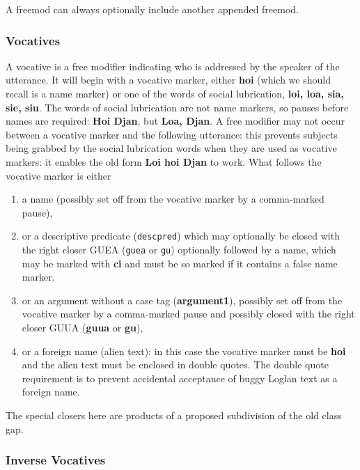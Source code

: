 \documentclass[12pt]{book}
\begin{document}
A freemod can always optionally include another appended freemod.

\subsubsection{Vocatives}

A vocative is a free modifier indicating who is addressed by the speaker of the utterance.  It will begin with a vocative marker, either
{\bf hoi} (which we should recall is a name marker) or one of the words of social lubrication, {\bf loi, loa, sia, sie, siu}.  The words of social lubrication are not name markers, so pauses before names are required:  {\bf Hoi Djan}, but {\bf Loa, Djan}.  A free modifier may not occur between a vocative marker and the following utterance:  this prevents subjects being grabbed by the social lubrication words when they are used as vocative markers:  it enables the old form {\bf Loi hoi Djan} to work.  What follows the vocative marker is either 

\begin{enumerate}

\item a name (possibly set off from the vocative marker by a comma-marked pause), 


\item or a descriptive predicate ({\tt descpred}) which may optionally be closed with the right closer GUEA ({\tt guea} or {\tt gu}) optionally followed by a name, which may be marked with {\bf ci} and must be so marked if it contains a false name marker.

\item or an argument without a case tag ({\bf argument1}), possibly set off from the vocative marker by a comma-marked pause and possibly closed with the right closer GUUA ({\bf guua} or {\bf gu}),

\item or a foreign name (alien text):  in this case the vocative marker must be {\bf hoi} and the alien text must be enclosed in double quotes.  The double quote requirement is to prevent accidental acceptance of buggy Loglan text as a foreign name.

\end{enumerate}

The special closers here are products of a proposed subdivision of the old class gap.

\subsubsection{Inverse Vocatives}
\end{document}
